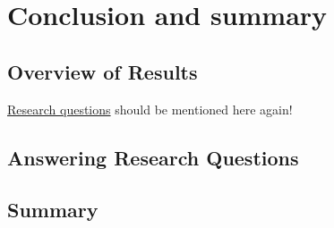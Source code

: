 \chapter{Conclusion and summary} \label{conclusion}

\section{Overview of Results} \label{overview}
\hyperref[rq]{Research questions} should be mentioned here again!

\section{Answering Research Questions} \label{RQ answers}

\section{Summary} \label{summary}
